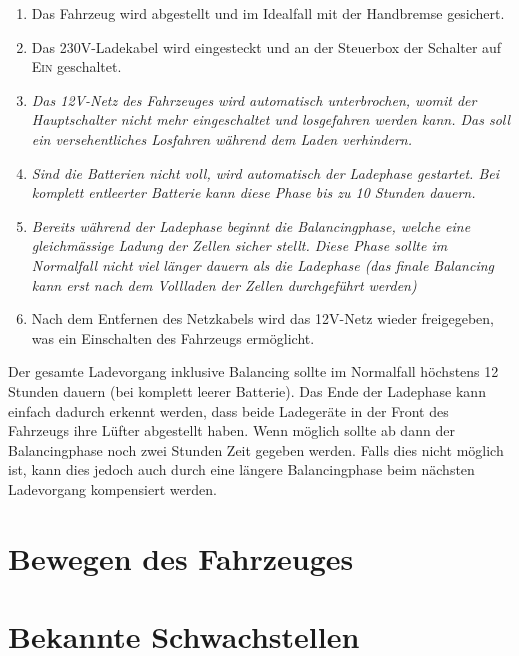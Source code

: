 \documentclass[a4paper]{fhnwreport}
\begin{document}
\begin{Large}
\begin{enumerate}
\setlength{\itemsep}{10pt}
	\item Das Fahrzeug wird abgestellt und im Idealfall mit der Handbremse gesichert.
	\item Das 230V-Ladekabel wird eingesteckt und an der Steuerbox der Schalter auf \textsc{Ein} geschaltet.
	\item \textit{Das 12V-Netz des Fahrzeuges wird automatisch unterbrochen, womit der Hauptschalter nicht mehr eingeschaltet und losgefahren werden kann. Das soll ein versehentliches Losfahren während dem Laden verhindern.}
	\item \textit{Sind die Batterien nicht voll, wird automatisch der Ladephase gestartet. Bei komplett entleerter Batterie kann diese Phase bis zu 10 Stunden dauern.}
	\item \textit{Bereits während der Ladephase beginnt die Balancingphase, welche eine gleichmässige Ladung der Zellen sicher stellt. Diese Phase sollte im Normalfall nicht viel länger dauern als die Ladephase (das finale Balancing kann erst nach dem Vollladen der Zellen durchgeführt werden)}
	\item Nach dem Entfernen des Netzkabels wird das 12V-Netz wieder freigegeben, was ein Einschalten des Fahrzeugs ermöglicht.
\end{enumerate}

Der gesamte Ladevorgang inklusive Balancing sollte im Normalfall höchstens 12 Stunden dauern (bei komplett leerer Batterie). Das Ende der Ladephase kann einfach dadurch erkennt werden, dass beide Ladegeräte in der Front des Fahrzeugs ihre Lüfter abgestellt haben. Wenn möglich sollte ab dann der Balancingphase noch zwei Stunden Zeit gegeben werden. Falls dies nicht möglich ist, kann dies jedoch auch durch eine längere Balancingphase beim nächsten Ladevorgang kompensiert werden.

\section{Bewegen des Fahrzeuges}

\section{Bekannte Schwachstellen}


\end{Large}
\end{document}
